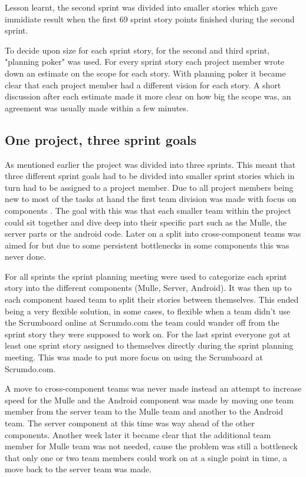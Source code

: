 Lesson learnt, the second sprint was divided into smaller stories which gave immidiate result when the first 69 sprint story points finished during the second sprint.

To decide upon size for each sprint story, for the second and third sprint, "planning poker" \cite[p.~42]{kniberg07} was used.
For every sprint story each project member wrote down an estimate on the scope for each story.
With planning poker it became clear that each project member had a different vision for each story.
A short discussion after each estimate made it more clear on how big the scope was, an agreement was usually made within a few minutes.

\subsection{One project, three sprint goals}
As mentioned earlier the project was divided into three sprints.
This meant that three different sprint goals had to be divided into smaller sprint stories which in turn had to be assigned to a project member.
Due to all project members being new to most of the tasks at hand the first team division was made with focus on components \cite[p.~106]{kniberg07}.
The goal with this was that each smaller team within the project could sit together and dive deep into their specific part such as the Mulle, the server parts or the android code.
Later on a split into cross-component teams \cite[p.~107]{kniberg07} was aimed for but due to some persistent bottlenecks in some components this was never done.

For all sprints the sprint planning meeting were used to categorize each sprint story into the different components (Mulle, Server, Android).
It was then up to each component based team to split their stories between themselves.
This ended being a very flexible solution, in some cases, to flexible when a team didn't use the Scrumboard online at Scrumdo.com the team could wander off from the sprint story they were supposed to work on.
For the last sprint everyone got at least one sprint story assigned to themselves directly during the sprint planning meeting.
This was made to put more focus on using the Scrumboard at Scrumdo.com.

A move to cross-component teams was never made instead an attempt to increase speed for the Mulle and the Android component was made by moving one team member from the server team to the Mulle team and another to the Android team.
The server component at this time was way ahead of the other components.
Another week later it became clear that the additional team member for Mulle team was not needed, cause the problem was still a bottleneck that only one or two team members could work on at a single point in time, a move back to the server team was made.

